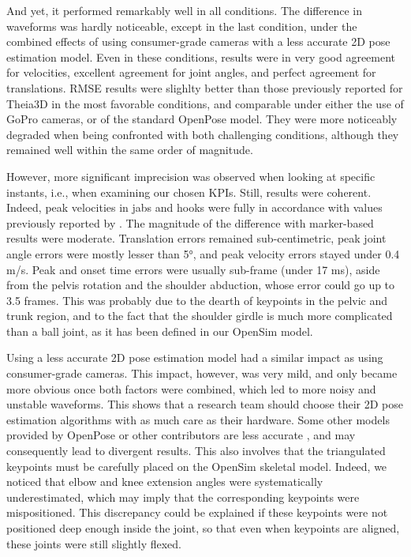 And yet, it performed remarkably well in all conditions. The difference in waveforms was hardly noticeable, except in the last condition, under the combined effects of using consumer-grade cameras with a less accurate 2D pose estimation model. Even in these conditions, results were in very good agreement for velocities, excellent agreement for joint angles, and perfect agreement for translations. RMSE results were slighlty better than those previously reported for Theia3D in the most favorable conditions, and comparable under either the use of GoPro cameras, or of the standard OpenPose model. They were more noticeably degraded when being confronted with both challenging conditions, although they remained well within the same order of magnitude.
\newpage

However, more significant imprecision was observed when looking at specific instants, i.e., when examining our chosen KPIs. Still, results were coherent. Indeed, peak velocities in jabs and hooks were fully in accordance with values previously reported by \cite{Whiting1988,Piorkowski2011}. 
The magnitude of the difference with marker-based results were moderate. Translation errors remained sub-centimetric, peak joint angle errors were mostly lesser than 5°, and peak velocity errors stayed under 0.4 m/s. Peak and onset time errors were usually sub-frame (under 17 ms), aside from the pelvis rotation and the shoulder abduction, whose error could go up to 3.5 frames. This was probably due to the dearth of keypoints in the pelvic and trunk region, and to the fact that the shoulder girdle is much more complicated than a ball joint, as it has been defined in our OpenSim model.

Using a less accurate 2D pose estimation model had a similar impact as using consumer-grade cameras. This impact, however, was very mild, and only became more obvious once both factors were combined, which led to more noisy and unstable waveforms. This shows that a research team should choose their 2D pose estimation algorithms with as much care as their hardware. Some other models provided by OpenPose or other contributors are less accurate \cite{Needham2021b}, and may consequently lead to divergent results. This also involves that the triangulated keypoints must be carefully placed on the OpenSim skeletal model. Indeed, we noticed that elbow and knee extension angles were systematically underestimated, which may imply that the corresponding keypoints were mispositioned. This discrepancy could be explained if these keypoints were not positioned deep enough inside the joint, so that even when keypoints are aligned, these joints were still slightly flexed. 

